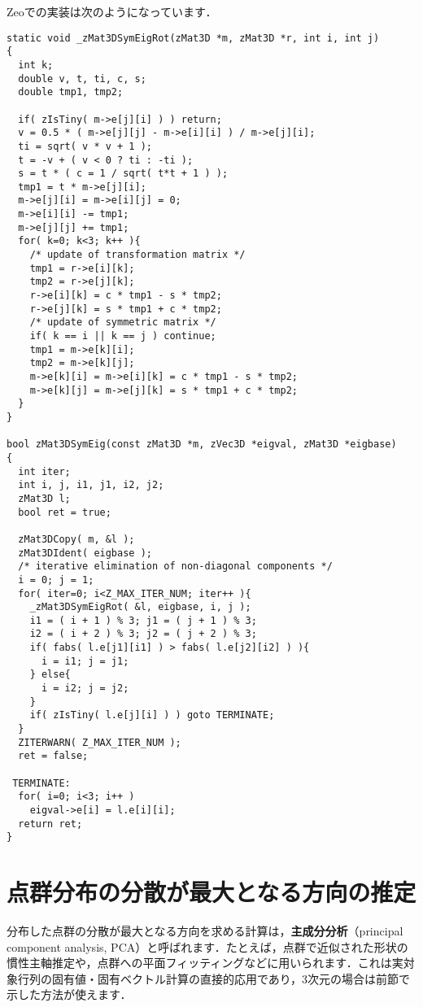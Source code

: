 ﻿\documentclass[a4paper]{jsarticle}
\begin{document}
Zeoでの実装は次のようになっています．
\begin{screen}
\begin{verbatim}
static void _zMat3DSymEigRot(zMat3D *m, zMat3D *r, int i, int j)
{
  int k;
  double v, t, ti, c, s;
  double tmp1, tmp2;

  if( zIsTiny( m->e[j][i] ) ) return;
  v = 0.5 * ( m->e[j][j] - m->e[i][i] ) / m->e[j][i];
  ti = sqrt( v * v + 1 );
  t = -v + ( v < 0 ? ti : -ti );
  s = t * ( c = 1 / sqrt( t*t + 1 ) );
  tmp1 = t * m->e[j][i];
  m->e[j][i] = m->e[i][j] = 0;
  m->e[i][i] -= tmp1;
  m->e[j][j] += tmp1;
  for( k=0; k<3; k++ ){
    /* update of transformation matrix */
    tmp1 = r->e[i][k];
    tmp2 = r->e[j][k];
    r->e[i][k] = c * tmp1 - s * tmp2;
    r->e[j][k] = s * tmp1 + c * tmp2;
    /* update of symmetric matrix */
    if( k == i || k == j ) continue;
    tmp1 = m->e[k][i];
    tmp2 = m->e[k][j];
    m->e[k][i] = m->e[i][k] = c * tmp1 - s * tmp2;
    m->e[k][j] = m->e[j][k] = s * tmp1 + c * tmp2;
  }
}

bool zMat3DSymEig(const zMat3D *m, zVec3D *eigval, zMat3D *eigbase)
{
  int iter;
  int i, j, i1, j1, i2, j2;
  zMat3D l;
  bool ret = true;

  zMat3DCopy( m, &l );
  zMat3DIdent( eigbase );
  /* iterative elimination of non-diagonal components */
  i = 0; j = 1;
  for( iter=0; i<Z_MAX_ITER_NUM; iter++ ){
    _zMat3DSymEigRot( &l, eigbase, i, j );
    i1 = ( i + 1 ) % 3; j1 = ( j + 1 ) % 3;
    i2 = ( i + 2 ) % 3; j2 = ( j + 2 ) % 3;
    if( fabs( l.e[j1][i1] ) > fabs( l.e[j2][i2] ) ){
      i = i1; j = j1;
    } else{
      i = i2; j = j2;
    }
    if( zIsTiny( l.e[j][i] ) ) goto TERMINATE;
  }
  ZITERWARN( Z_MAX_ITER_NUM );
  ret = false;

 TERMINATE:
  for( i=0; i<3; i++ )
    eigval->e[i] = l.e[i][i];
  return ret;
}
\end{verbatim}
\end{screen}


\section{点群分布の分散が最大となる方向の推定}

分布した点群の分散が最大となる方向を求める計算は，{\bf 主成分分析}（principal component analysis, PCA）と呼ばれます．たとえば，点群で近似された形状の慣性主軸推定や，点群への平面フィッティングなどに用いられます．これは実対象行列の固有値・固有ベクトル計算の直接的応用であり，3次元の場合は前節で示した方法が使えます．
\end{document}
